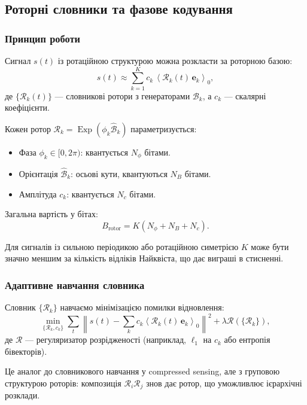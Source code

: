 \documentclass[11pt,a4paper]{article}
\newcommand{\grade}[2]{\left\langle #1 \right\rangle_{#2}}
\newcommand{\scal}[1]{\grade{#1}{0}}
\newcommand{\Exp}{\operatorname{Exp}}
\newcommand{\Rotor}{\mathcal{R}}
\newcommand{\Biv}{\mathcal{B}}
\theoremstyle{definition}
\theoremstyle{plain}
\theoremstyle{remark}
\begin{document}
\subsection{Роторні словники та фазове кодування}

\subsubsection{Принцип роботи}

Сигнал $s(t)$ із ротаційною структурою можна розкласти за роторною базою:
\begin{equation}
s(t) \approx \sum_{k=1}^K c_k \,\scal{\Rotor_k(t)\, \mathbf{e}_k},
\end{equation}
де $\{\Rotor_k(t)\}$ — словникові ротори з генераторами $\Biv_k$, а $c_k$ — скалярні коефіцієнти.

Кожен ротор $\Rotor_k = \Exp(\phi_k \hat{\Biv}_k)$ параметризується:
\begin{itemize}
  \item Фаза $\phi_k \in [0, 2\pi)$: квантується $N_\phi$ бітами.
  \item Орієнтація $\hat{\Biv}_k$: осьові кути, квантуються $N_B$ бітами.
  \item Амплітуда $c_k$: квантується $N_c$ бітами.
\end{itemize}

Загальна вартість у бітах:
\begin{equation}
B_{\text{rotor}} = K(N_\phi + N_B + N_c).
\end{equation}

Для сигналів із сильною періодикою або ротаційною симетрією $K$ може бути значно меншим за кількість відліків Найквіста, що дає виграші в стисненні.

\subsubsection{Адаптивне навчання словника}

Словник $\{\Rotor_k\}$ навчаємо мінімізацією помилки відновлення:
\begin{equation}
\min_{\{\Rotor_k, c_k\}} \sum_t \left\|s(t) - \sum_k c_k \scal{\Rotor_k(t)\, \mathbf{e}_k}\right\|^2 + \lambda \mathcal{R}(\{\Rotor_k\}),
\end{equation}
де $\mathcal{R}$ — регуляризатор розрідженості (наприклад, $\ell_1$ на $c_k$ або ентропія бівекторів).

Це аналог до словникового навчання у compressed sensing, але з груповою структурою роторів: композиція $\Rotor_i \Rotor_j$ знов дає ротор, що уможливлює ієрархічні розклади.
\end{document}
